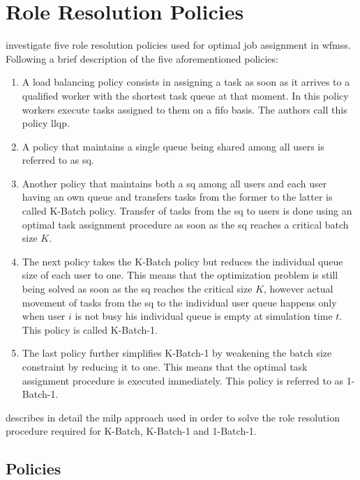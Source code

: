\chapter{Role Resolution Policies}
\label{ch:policies}

\citet[p. 7]{Zeng2005} investigate five role resolution policies used for optimal job assignment in \glspl{wfms}. Following a brief description of the five aforementioned policies:

\begin{enumerate}[label=\textbf{P. \Roman*}]
	\item A load balancing policy consists in assigning a task as soon as it arrives to a qualified worker with the shortest task queue at that moment. In this policy workers execute tasks assigned to them on a \gls{fifo} basis. The authors call this policy \gls{llqp}.
	\item A policy that maintains a single queue being shared among all users is referred to as \gls{sq}.
	\item Another policy that maintains both a \gls{sq} among all users and each user having an own queue and transfers tasks from the former to the latter is called K-Batch policy. Transfer of tasks from the \gls{sq} to users is done using an optimal task assignment procedure as soon as the \gls{sq} reaches a critical batch size $K$.
	\item The next policy takes the K-Batch policy but reduces the individual queue size of each user to one. This means that the optimization problem is still being solved as soon as the \gls{sq} reaches the critical size $K$, however actual movement of tasks from the \gls{sq} to the individual user queue happens only when user $i$ is not busy \ie his individual queue is empty at simulation time $t$. This policy is called K-Batch-1.
	\item The last policy further simplifies K-Batch-1 by weakening the batch size constraint by reducing it to one. This means that the optimal task assignment procedure is executed immediately. This policy is referred to as 1-Batch-1.
\end{enumerate}

 describes in detail the \gls{milp} approach used in order to solve the role resolution procedure required for K-Batch, K-Batch-1 and 1-Batch-1.

\section{ Policies}
\label{sec:opt_policies}

